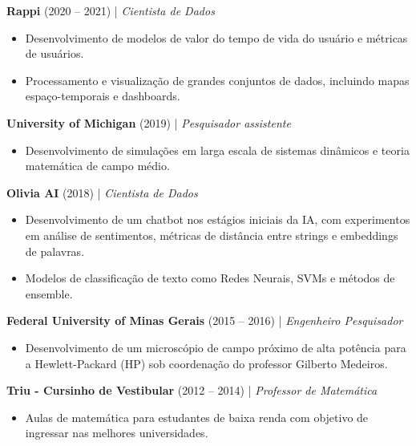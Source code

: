 \documentclass[10pt,a4paper]{article}
\begin{document}
\vspace{4pt}

\textbf{Rappi} (2020 -- 2021) | \textit{Cientista de Dados} 
\begin{itemize}[noitemsep, topsep=0pt]
	\item Desenvolvimento de modelos de valor do tempo de vida do usuário e métricas de usuários.
	\item Processamento e visualização de grandes conjuntos de dados, incluindo mapas espaço-temporais e dashboards.
\end{itemize}

\vspace{4pt}

\textbf{University of Michigan} (2019) | \textit{Pesquisador assistente} 
\begin{itemize}[noitemsep, topsep=0pt]
	\item Desenvolvimento de simulações em larga escala de sistemas dinâmicos e teoria matemática de campo médio.
\end{itemize}

\vspace{4pt}

\textbf{Olivia AI} (2018) | \textit{Cientista de Dados} 
\begin{itemize}[noitemsep, topsep=0pt]
	\item Desenvolvimento de um chatbot nos estágios iniciais da IA, com experimentos em análise de sentimentos, métricas de distância entre strings e embeddings de palavras.
	\item Modelos de classificação de texto como Redes Neurais, SVMs e métodos de ensemble.
\end{itemize}

\vspace{4pt}

\textbf{Federal University of Minas Gerais} (2015 -- 2016) | \textit{Engenheiro Pesquisador} 
\begin{itemize}[noitemsep, topsep=0pt]
	\item Desenvolvimento de um microscópio de campo próximo de alta potência para a Hewlett-Packard (HP) sob coordenação do professor Gilberto Medeiros.
\end{itemize}

\vspace{4pt}

\textbf{Triu - Cursinho de Vestibular} (2012 -- 2014) | \textit{Professor de Matemática} 
\begin{itemize}[noitemsep, topsep=0pt]
	\item Aulas de matemática para estudantes de baixa renda com objetivo de ingressar nas melhores universidades.
\end{itemize}
\end{document}
